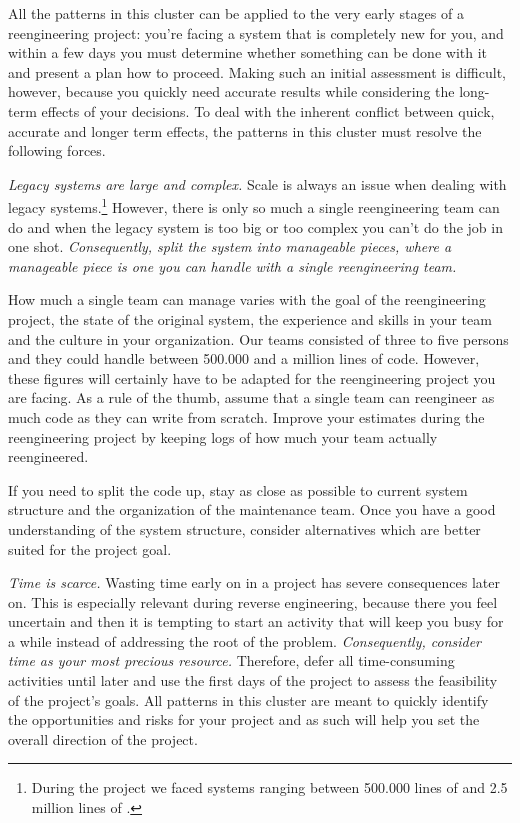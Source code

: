 \documentclass[a4paper,10pt,twoside]{book}
\begin{document}
All the patterns in this cluster can be applied to the very early stages of a reengineering project: you're facing a system that is completely new for you, and within a few days you must determine whether something can be done with it and present a plan how to proceed. Making such an initial assessment is difficult, however, because you quickly need accurate results while considering the long-term effects of your decisions. To deal with the inherent conflict between quick, accurate and longer term effects, the patterns in this cluster must resolve the following forces.

\begin{bulletlist}
  \item \emph{Legacy systems are large and complex.}
Scale is always an issue when dealing with legacy systems.\footnote{During the  project we faced systems ranging between 500.000 lines of  and 2.5 million lines of .}
However, there is only so much a single reengineering team can do and when the legacy system is too big or too complex you can't do the job in one shot.
\emph{Consequently, split the system into manageable pieces, where a manageable piece is one you can handle with a single reengineering team.}

How much a single team can manage varies with the goal of the reengineering project, the state of the original system, the experience and skills in your team and the culture in your organization. Our teams consisted of three to five persons and they could handle between 500.000 and a million lines of code. However, these figures will certainly have to be adapted for the reengineering project you are facing. As a rule of the thumb, assume that a single team can reengineer as much code as they can write from scratch. Improve your estimates during the reengineering project by keeping logs of how much your team actually reengineered.

If you need to split the code up, stay as close as possible to current system structure and the organization of the maintenance team. Once you have a good understanding of the system structure, consider alternatives which are better suited for the project goal.

  \item \emph{Time is scarce.}
Wasting time early on in a project has severe consequences later on. This is especially relevant during reverse engineering, because there you feel uncertain and then it is tempting to start an activity that will keep you busy for a while instead of addressing the root of the problem. \emph{Consequently, consider time as your most precious resource.} Therefore, defer all time-consuming activities until later and use the first days of the project to assess the feasibility of the project's goals. All patterns in this cluster are meant to quickly identify the opportunities and risks for your project and as such will help you set the overall direction of the project.


\end{bulletlist}
\end{document}
